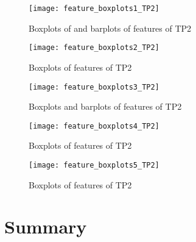 \begin{figure}[H]
    \hspace*{-1.0cm}
    \centering
    \texttt{[image: feature\_boxplots1\_TP2]}
    \caption{Boxplots of and barplots of features of TP2}
    \label{fig:feature_boxplots1}
\end{figure}

\begin{figure}[H]
    \hspace*{-1.0cm}
    \centering
    \texttt{[image: feature\_boxplots2\_TP2]}
    \caption{Boxplots of features of TP2}
    \label{fig:feature_boxplots2}
\end{figure}
\begin{figure}[H]
    \hspace*{-1.0cm}
    \centering
    \texttt{[image: feature\_boxplots3\_TP2]}
    \caption{Boxplots and barplots of features of TP2}
    \label{fig:feature_boxplots3}
\end{figure}
\begin{figure}[H]
    \hspace*{-1.0cm}
    \centering
    \texttt{[image: feature\_boxplots4\_TP2]}
    \caption{Boxplots of features of TP2}
    \label{fig:feature_boxplots4}
\end{figure}
\begin{figure}[H]
    \hspace*{-1.0cm}
    \centering
    \texttt{[image: feature\_boxplots5\_TP2]}
    \caption{Boxplots of features of TP2}
    \label{fig:feature_boxplots5}
\end{figure}
\section{Summary}